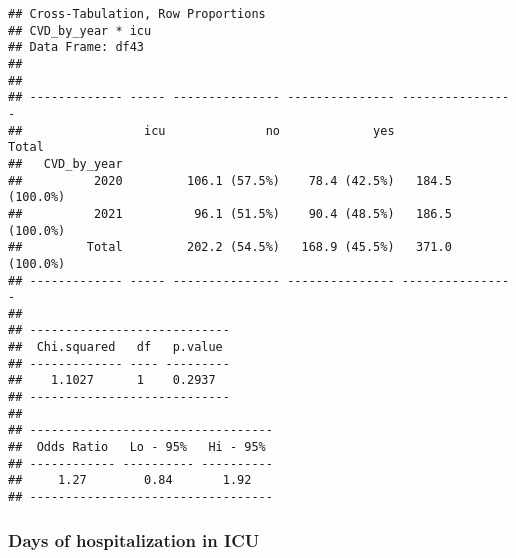 \documentclass[
]{article}
\newenvironment{Shaded}{\begin{snugshade}}{\end{snugshade}}
\newcommand{\AttributeTok}[1]{\textcolor[rgb]{0.13,0.29,0.53}{#1}}
\newcommand{\FunctionTok}[1]{\textcolor[rgb]{0.13,0.29,0.53}{\textbf{#1}}}
\newcommand{\NormalTok}[1]{#1}
\newcommand{\OtherTok}[1]{\textcolor[rgb]{0.56,0.35,0.01}{#1}}
\newcommand{\SpecialCharTok}[1]{\textcolor[rgb]{0.81,0.36,0.00}{\textbf{#1}}}
\newcommand{\StringTok}[1]{\textcolor[rgb]{0.31,0.60,0.02}{#1}}
\begin{document}
\begin{verbatim}
## Cross-Tabulation, Row Proportions  
## CVD_by_year * icu  
## Data Frame: df43  
## 
## 
## ------------- ----- --------------- --------------- ----------------
##                 icu              no             yes            Total
##   CVD_by_year                                                       
##          2020         106.1 (57.5%)    78.4 (42.5%)   184.5 (100.0%)
##          2021          96.1 (51.5%)    90.4 (48.5%)   186.5 (100.0%)
##         Total         202.2 (54.5%)   168.9 (45.5%)   371.0 (100.0%)
## ------------- ----- --------------- --------------- ----------------
## 
## ----------------------------
##  Chi.squared   df   p.value 
## ------------- ---- ---------
##    1.1027      1    0.2937  
## ----------------------------
## 
## ----------------------------------
##  Odds Ratio   Lo - 95%   Hi - 95% 
## ------------ ---------- ----------
##     1.27        0.84       1.92   
## ----------------------------------
\end{verbatim}

\hypertarget{days-of-hospitalization-in-icu-1}{%
\subsubsection{\texorpdfstring{{ Days of hospitalization in ICU
}}{ Days of hospitalization in ICU }}\label{days-of-hospitalization-in-icu-1}}

\begin{Shaded}
\end{Shaded}
\end{document}
